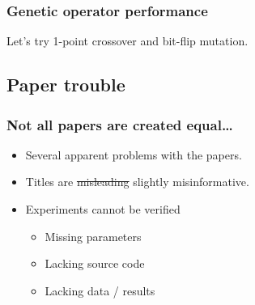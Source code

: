 \documentclass{beamer}
\begin{document}
\begin{frame}
\frametitle{Genetic operator performance}
Let's try 1-point crossover and bit-flip mutation.

\vfill


\end{frame}

\subsection{Paper trouble}
\begin{frame}
\frametitle{Not all papers are created equal\dots}
\begin{itemize}
\item Several apparent problems with the papers.
\item Titles are \sout{misleading} slightly misinformative.
\item Experiments cannot be verified
\begin{itemize}
\item Missing parameters
\item Lacking source code
\item Lacking data / results
\end{itemize}
\end{itemize}
\end{frame}
\end{document}
